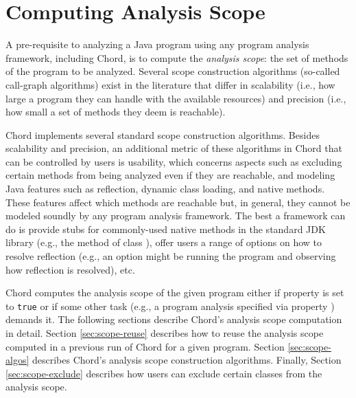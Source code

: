 \chapter{Computing Analysis Scope}
\label{chap:computing-scope}

A pre-requisite to analyzing a Java program using any program analysis framework,
including Chord, is to compute the {\it analysis scope}: the set of methods
of the program to be analyzed.  Several scope construction algorithms (so-called
call-graph algorithms) exist in the literature that differ in scalability (i.e., how large
a program they can handle with the available resources) and precision (i.e., how small a
set of methods they deem is reachable).

Chord implements several standard scope construction algorithms.  Besides scalability and precision,
an additional metric of these algorithms in Chord that can be controlled by users is usability,
which concerns aspects such as excluding certain methods from being analyzed even if they
are reachable, and modeling Java features such as reflection,
dynamic class loading, and native methods.
These features affect which methods are
reachable but, in general, they cannot be modeled soundly by any program analysis framework.  The best
a framework can do is
 provide stubs for commonly-used native methods in the standard JDK library (e.g., the 
method of class ), 
offer users a range of options on how to resolve reflection (e.g.,
an option might be running the program and observing how reflection is resolved), etc.

Chord computes the analysis scope of the given
program either if property  is set to {\tt true} or if some other task
(e.g., a program analysis specified via property ) demands it.
The following sections describe Chord's analysis scope 
computation in detail.  Section \ref{sec:scope-reuse} describes how to reuse the analysis scope
computed in a previous run of Chord for a given program.  Section \ref{sec:scope-algos} describes
Chord's analysis scope construction algorithms.  Finally, Section \ref{sec:scope-exclude} describes how users
can exclude certain classes from the analysis scope.

